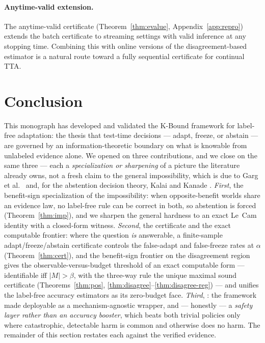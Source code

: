 \paragraph{Anytime-valid extension.}
The anytime-valid certificate (Theorem~\ref{thm:evalue}, Appendix~\ref{app:repro})
extends the batch certificate to streaming settings with valid inference at any
stopping time.  Combining this with online versions of the disagreement-based
estimator is a natural route toward a fully sequential certificate for continual TTA.

\section{Conclusion}\label{sec:disc-conclusion}

This monograph has developed and validated the K-Bound framework for label-free
adaptation: the thesis that test-time decisions --- adapt, freeze, or abstain ---
are governed by an information-theoretic boundary on what is knowable from
unlabeled evidence alone.  We opened on three contributions, and we close on the
same three --- each a \emph{specialization or sharpening} of a picture the
literature already owns, not a fresh claim to the general impossibility, which is
due to Garg et al.\ \cite{garg2022atc} and, for the abstention decision theory,
Kalai and Kanade \cite{kalai2021abstain}.  \emph{First}, the benefit-sign
specialization of the impossibility: when opposite-benefit worlds share an evidence
law, no label-free rule can be correct in both, so abstention is forced
(Theorem~\ref{thm:imp}), and we sharpen the general hardness to an exact Le~Cam
identity with a closed-form witness.  \emph{Second}, the certificate and the exact
computable frontier: where the question \emph{is} answerable, a finite-sample
adapt/freeze/abstain certificate controls the false-adapt and false-freeze rates at
$\alpha$ (Theorem~\ref{thm:cert}), and the benefit-sign frontier on the
disagreement region gives the observable-versus-budget threshold of
\cite{kalai2021abstain} an exact computable form --- identifiable iff $|M|>\beta$,
with the three-way rule the unique maximal sound certificate
(Theorems~\ref{thm:pos}, \ref{thm:disagree}--\ref{thm:disagree-reg}) --- and
unifies the label-free accuracy estimators as its zero-budget face.  \emph{Third},
\KGA: the framework made deployable as a mechanism-agnostic wrapper, and ---
honestly --- a \emph{safety layer rather than an accuracy booster}, which beats both
trivial policies only where catastrophic, detectable harm is common and otherwise
does no harm.  The remainder of this section restates each against the verified
evidence.

